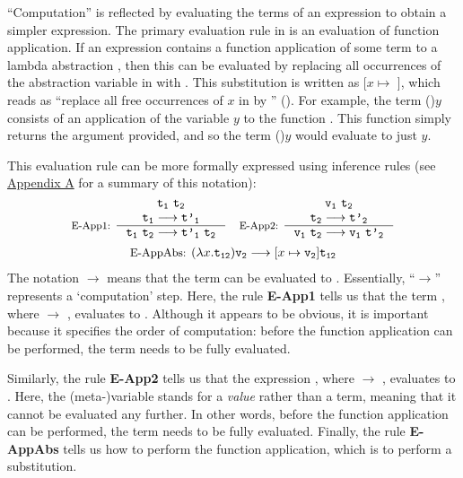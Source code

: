 ``Computation'' is reflected by evaluating the terms of an expression to obtain a simpler expression. The primary evaluation rule in \lambdacalc{} is an evaluation of function application. If an expression contains a function application of some term  to a lambda abstraction , then this can be evaluated by replacing all occurrences of the abstraction variable in  with . This substitution is written as [$x \mapsto$ ], which reads as ``replace all free occurrences of $x$ in  by '' (\cite{pierce}). For example, the term ()$y$ consists of an application of the variable $y$ to the function . This function simply returns the argument provided, and so the term ()$y$ would evaluate to just $y$.

This evaluation rule can be more formally expressed using inference rules (see \hyperref[sec:AppA]{Appendix A} for a summary of this notation):
\begin{align*}
\inference[E-App1: ]{
  \tm{t}{1} \ \tm{t}{2} \\
  \tm{t}{1} \longrightarrow \tm{t'}{1}
}{\tm{t}{1} \ \tm{t}{2} \longrightarrow \tm{t'}{1} \ \tm{t}{2}}
\quad
\inference[E-App2: ]{
  \tm{v}{1} \ \tm{t}{2} \\
  \tm{t}{2} \longrightarrow \tm{t'}{2}
}{\tm{v}{1} \ \tm{t}{2} \longrightarrow \tm{v}{1} \ \tm{t'}{2}}
\end{align*}
\begin{align*}
\textnormal{\small E-AppAbs: }(\lambda x.\texttt{t\textsubscript{12}})\texttt{v\textsubscript{2}} \longrightarrow [x \mapsto \texttt{v\textsubscript{2}}]\texttt{t\textsubscript{12}}
\end{align*}
The notation  $\longrightarrow$  means that the term  can be evaluated to . Essentially, ``$\longrightarrow$'' represents a `computation' step. Here, the rule \textbf{E-App1} tells us that the term  , where  $\longrightarrow$ , evaluates to  . Although it appears to be obvious, it is important because it specifies the order of computation: before the function application   can be performed, the term  needs to be fully evaluated.

Similarly, the rule \textbf{E-App2} tells us that the expression  , where  $\longrightarrow$ , evaluates to  . Here, the (meta-)variable  stands for a \textit{value} rather than a term, meaning that it cannot be evaluated any further. In other words, before the function application   can be performed, the term  needs to be fully evaluated. Finally, the rule \textbf{E-AppAbs} tells us how to perform the function application, which is to perform a substitution.

